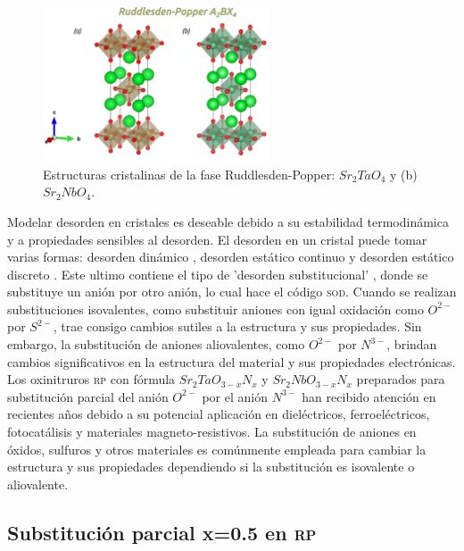 \begin{figure}[H]
    \centering
    \includegraphics[width=0.6\textwidth]{Figs/rp_ta-nb.png}
    \caption{Estructuras cristalinas de la fase Ruddlesden-Popper: \textcolor{Sr}{$Sr_{2}$}\textcolor{Ta}{$Ta$}\textcolor{O}{$O_{4}$} y (b) \textcolor{Sr}{$Sr_{2}$}\textcolor{Nb}{$Nb$}\textcolor{O}{$O_{4}$}.}
    \label{Fig. rp_nb-ta}
\end{figure}

Modelar desorden en cristales es deseable debido a su estabilidad termodinámica y a propiedades sensibles al desorden.  El desorden en un cristal puede tomar varias formas: desorden dinámico \cite{Chick2009analysis}, desorden estático continuo y desorden estático discreto \cite{Muller2009structures}. Este ultimo contiene el tipo de 'desorden substitucional' \cite{Habgood2011model}, donde se substituye un anión por otro anión, lo cual hace el código \textsc{sod}\cite{Grau-Crespo2007}. Cuando se realizan substituciones isovalentes, como substituir aniones con igual oxidación como $O^{2-}$ por $S^{2-}$, trae consigo cambios sutiles a la estructura y sus propiedades. Sin embargo, la substitución de aniones aliovalentes, como $O^{2-}$ por $N^{3-}$, brindan cambios significativos en la estructura del material y sus propiedades electrónicas\cite{Roy2019}. Los oxinitruros \textsc{rp} con fórmula $Sr_{2}TaO_{3-x}N_{x}$ y $Sr_{2}NbO_{3-x}N_{x}$ preparados para substitución parcial del anión $O^{2-}$ por el anión $N^{3-}$ han recibido atención en recientes años debido a su potencial aplicación en dieléctricos, ferroeléctricos, fotocatálisis y materiales magneto-resistivos\cite{Fuertes2011}. La substitución de aniones en óxidos, sulfuros y otros materiales es comúnmente empleada para cambiar la estructura y sus propiedades dependiendo si la substitución es isovalente o aliovalente. 

\subsection{Substitución parcial x=0.5 en \textsc{rp}}

